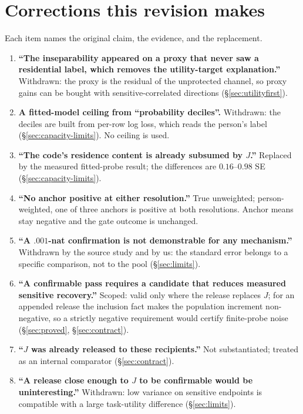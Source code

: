 \documentclass[conference]{IEEEtran}
\begin{document}
\section{Corrections this revision makes}
\label{app:corrections}
Each item names the original claim, the evidence, and the replacement.
\begin{enumerate}\itemsep2pt
\item \textbf{``The inseparability appeared on a proxy that never saw a residential label, which removes
the utility-target explanation.''} Withdrawn: the proxy is the residual of the unprotected channel, so
proxy gains can be bought with sensitive-correlated directions (\S\ref{sec:utilityfirst}).
\item \textbf{A fitted-model ceiling from ``probability deciles''.} Withdrawn: the deciles are built from
per-row log loss, which reads the person's label (\S\ref{sec:capacity-limits}). No ceiling is used.
\item \textbf{``The code's residence content is already subsumed by $J$.''} Replaced by the measured
fitted-probe result; the differences are $0.16$--$0.98$ SE (\S\ref{sec:capacity-limits}).
\item \textbf{``No anchor positive at either resolution.''} True unweighted; person-weighted, one of
three anchors is positive at both resolutions. Anchor means stay negative and the gate outcome is
unchanged.
\item \textbf{``A $.001$-nat confirmation is not demonstrable for any mechanism.''} Withdrawn by the
source study and by us: the standard error belongs to a specific comparison, not to the pool
(\S\ref{sec:limits}).
\item \textbf{``A confirmable pass requires a candidate that reduces measured sensitive recovery.''}
Scoped: valid only where the release replaces $J$; for an appended release the inclusion fact makes the
population increment non-negative, so a strictly negative requirement would certify finite-probe noise
(\S\ref{sec:proved}, \S\ref{sec:contract}).
\item \textbf{``$J$ was already released to these recipients.''} Not substantiated; treated as an
internal comparator (\S\ref{sec:contract}).
\item \textbf{``A release close enough to $J$ to be confirmable would be uninteresting.''} Withdrawn: low
variance on sensitive endpoints is compatible with a large task-utility difference (\S\ref{sec:limits}).
\end{enumerate}
\end{document}
